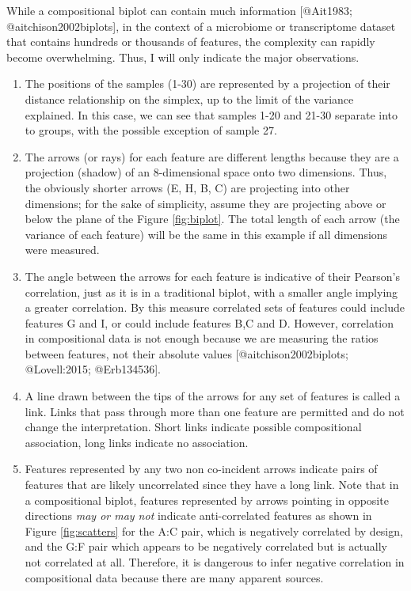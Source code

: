 \documentclass[
  onecolumn]{article}
\begin{document}
While a compositional biplot can contain much information {[}@Ait1983; @aitchison2002biplots{]}, in the context of a microbiome or transcriptome dataset that contains hundreds or thousands of features, the complexity can rapidly become overwhelming. Thus, I will only indicate the major observations.

\begin{enumerate}
\def\labelenumi{\arabic{enumi}.}
\item
  The positions of the samples (1-30) are represented by a projection of their distance relationship on the simplex, up to the limit of the variance explained. In this case, we can see that samples 1-20 and 21-30 separate into to groups, with the possible exception of sample 27.
\item
  The arrows (or rays) for each feature are different lengths because they are a projection (shadow) of an 8-dimensional space onto two dimensions. Thus, the obviously shorter arrows (E, H, B, C) are projecting into other dimensions; for the sake of simplicity, assume they are projecting above or below the plane of the Figure \ref{fig:biplot}. The total length of each arrow (the variance of each feature) will be the same in this example if all dimensions were measured.
\item
  The angle between the arrows for each feature is indicative of their Pearson's correlation, just as it is in a traditional biplot, with a smaller angle implying a greater correlation. By this measure correlated sets of features could include features G and I, or could include features B,C and D. However, correlation in compositional data is not enough because we are measuring the ratios between features, not their absolute values {[}@aitchison2002biplots; @Lovell:2015; @Erb134536{]}.
\item
  A line drawn between the tips of the arrows for any set of features is called a link. Links that pass through more than one feature are permitted and do not change the interpretation. Short links indicate possible compositional association, long links indicate no association.
\item
  Features represented by any two non co-incident arrows indicate pairs of features that are likely uncorrelated since they have a long link. Note that in a compositional biplot, features represented by arrows pointing in opposite directions \emph{may or may not} indicate anti-correlated features as shown in Figure \ref{fig:scatters} for the A:C pair, which is negatively correlated by design, and the G:F pair which appears to be negatively correlated but is actually not correlated at all. Therefore, it is dangerous to infer negative correlation in compositional data because there are many apparent sources.

\end{enumerate}
\end{document}
